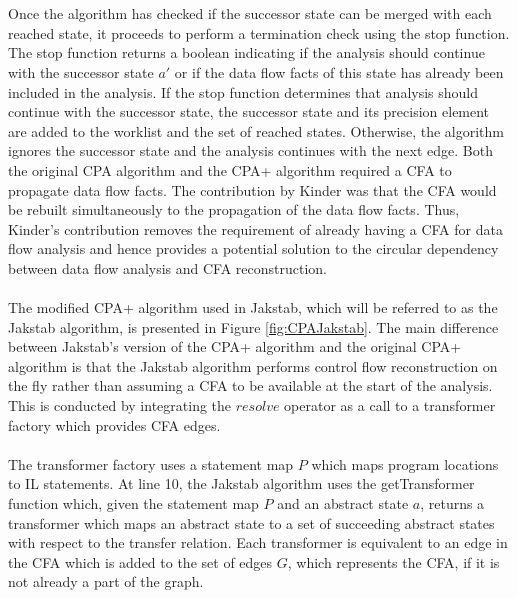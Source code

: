 \documentclass{kththesis}
\begin{document}
\\ \\
Once the algorithm has checked if the successor state can be merged with each reached state, it proceeds to perform a termination check using the stop function. The stop function returns a boolean indicating if the analysis should continue with the successor state $a{'}$ or if the data flow facts of this state has already been included in the analysis. If the stop function determines that analysis should continue with the successor state, the successor state and its precision element are added to the worklist and the set of reached states. Otherwise, the algorithm ignores the successor state and the analysis continues with the next edge. 
\clearpage
\noindent
Both the original CPA algorithm and the CPA+ algorithm required a CFA to propagate data flow facts. The contribution by Kinder\cite{Jakstab} was that the CFA would be rebuilt simultaneously to the propagation of the data flow facts. Thus, Kinder's contribution removes the requirement of already having a CFA for data flow analysis and hence provides a potential solution to the circular dependency between data flow analysis and CFA reconstruction.
\\ \\ 
The modified CPA+ algorithm used in Jakstab, which will be referred to as the Jakstab algorithm, is presented in Figure \ref{fig:CPAJakstab}. The main difference between Jakstab's version of the CPA+ algorithm and the original CPA+ algorithm is that the Jakstab algorithm performs control flow reconstruction on the fly rather than assuming a CFA to be available at the start of the analysis. This is conducted by integrating the $resolve$ operator as a call to a transformer factory which provides CFA edges.
\\ \\
The transformer factory uses a statement map $P$ which maps program locations to IL statements. At line 10, the Jakstab algorithm uses the getTransformer function which, given the statement map $P$ and an abstract state $a$, returns a transformer which maps an abstract state to a set of succeeding abstract states with respect to the transfer relation. Each transformer is equivalent to an edge in the CFA which is added to the set of edges $G$, which represents the CFA, if it is not already a part of the graph.
\end{document}
